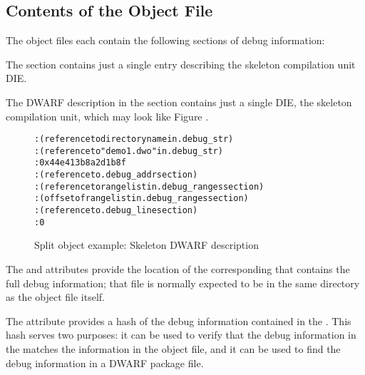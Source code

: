 \clearpage
\subsection{Contents of the Object File}
The object files each contain the following sections of debug
information:
\begin{alltt}
  \dotdebugabbrev
  \dotdebuginfo
  \dotdebugranges
  \dotdebugline
  \dotdebugstr
  \dotdebugaddr
  \dotdebugnames
  \dotdebugaranges
\end{alltt}

The \dotdebugabbrev{} section contains just a single entry describing
the skeleton compilation unit DIE.

The DWARF description in the \dotdebuginfo{} section 
contains just a single DIE, the skeleton compilation unit, 
which may look like 
Figure .

\begin{figure}[h]
\begin{dwflisting}
\begin{alltt}

    \DWTAGcompileunit
      \DWATcompdir: (reference to directory name in .debug_str)
      \DWATdwoname: (reference to "demo1.dwo" in .debug_str)
      \DWATdwoid: 0x44e413b8a2d1b8f
      \DWATaddrbase: (reference to .debug_addr section)
      \DWATrangesbase: (reference to range list in .debug_ranges section)
      \DWATranges: (offset of range list in .debug_ranges section)
      \DWATstmtlist: (reference to .debug_line section)
      \DWATlowpc: 0
      
\end{alltt}
\end{dwflisting}
\caption{Split object example: Skeleton DWARF description}
\label{fig:splitdwafexampleskeletondwarfdescription}
\end{figure}

The \DWATcompdir{} and \DWATdwoname{} attributes provide the
location of the corresponding \splitDWARFobjectfile{} that
contains the full debug information; that file is normally
expected to be in the same directory as the object file itself.

The \DWATdwoid{} attribute provides a hash of the debug
information contained in the \splitDWARFobjectfile. This hash serves
two purposes: it can be used to verify that the debug information
in the \splitDWARFobjectfile{} matches the information in the object
file, and it can be used to find the debug information in a DWARF
package file.

